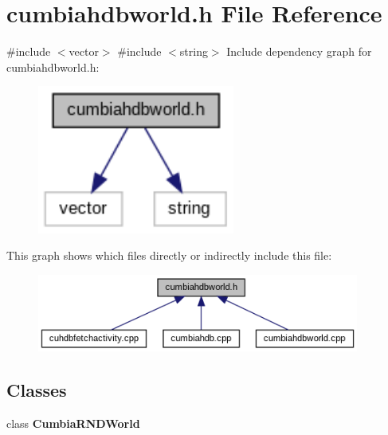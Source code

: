 \section{cumbiahdbworld.\+h File Reference}
\label{cumbiahdbworld_8h}
{\ttfamily \#include $<$vector$>$}\newline
{\ttfamily \#include $<$string$>$}\newline
Include dependency graph for cumbiahdbworld.\+h\+:
\nopagebreak
\begin{figure}[H]
\begin{center}
\leavevmode
\includegraphics[width=184pt]{cumbiahdbworld_8h__incl}
\end{center}
\end{figure}
This graph shows which files directly or indirectly include this file\+:
\nopagebreak
\begin{figure}[H]
\begin{center}
\leavevmode
\includegraphics[width=300pt]{cumbiahdbworld_8h__dep__incl}
\end{center}
\end{figure}
\subsection*{Classes}
\begin{DoxyCompactItemize}
\item 
class \textbf{ Cumbia\+R\+N\+D\+World}
\end{DoxyCompactItemize}
